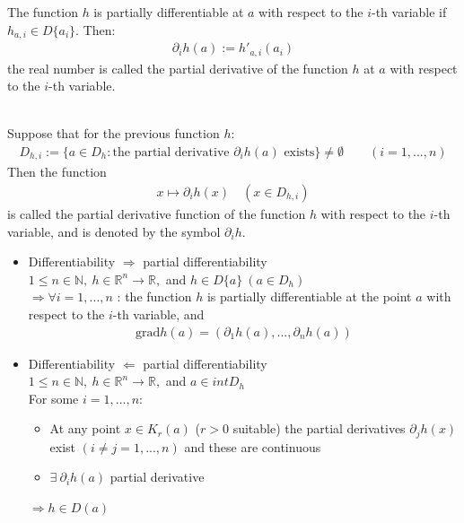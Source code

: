 \documentclass[margin=0px]{article}
\newcommand{\R}{\mathbb{R}}
\begin{document}
\begin{description}
        The function $ h $ is partially differentiable at $a$ with respect to the $i$-th variable if $ h_{a,i} \in D\{a_i\} $. Then:
        \begin{align*}
            \partial_ih(a) := h'_{a,i}(a_i)
        \end{align*}
        the real number is called the partial derivative of the function $h$ at $a$ with respect to the $i$-th variable.
    \item[Partial derivative function] \hfill \\
        Suppose that for the previous function $h$:
        \begin{align*}
            D_{h,i} := \{a \in D_h : \textrm{the partial derivative } \partial_ih(a) \textrm{ exists}\} \neq \emptyset \qquad (i=1,...,n)
        \end{align*}
        Then the function
        \begin{align*}
            x \mapsto \partial_ih(x) \quad (x\in D_{h,i})
        \end{align*}
        is called the partial derivative function of the function $h$ with respect to the $i$-th variable, and is denoted by the symbol $\partial_ih$.
    \item[Differentiability and partial differentiability] \hfill
        \begin{itemize}
            \item Differentiability $\Rightarrow$ partial differentiability \\
                  $ 1 \leq n \in \mathbb{N}, \ h \in \R^n \rightarrow \R, $ and $h\in D\{a\} \ (a \in D_h) $ \\
                  $\Rightarrow \forall i = 1,...,n$ : the function $h$ is partially differentiable at the point $a$ with respect to the $i$-th variable, and
                  \begin{align*}
                      \textrm{grad}h(a) = (\partial_1h(a), ..., \partial_nh(a))
                  \end{align*}

            \item Differentiability $\Leftarrow$ partial differentiability \\
                  $ 1 \leq n \in \mathbb{N}, \ h \in \R^n \rightarrow \R, $ and $ a \in intD_h $ \\
                  For some $i = 1,...,n$:
                  \begin{itemize}
                      \item At any point $ x \in K_r(a) $ ($r > 0$ suitable) the partial derivatives $ \partial_jh(x)$ exist $ (i \neq j = 1,...,n)$ and these are continuous
                      \item $\exists \ \partial_ih(a)$ partial derivative
                  \end{itemize}
                  $\Rightarrow h\in D(a)$
        \end{itemize}
\end{description}
\end{document}
